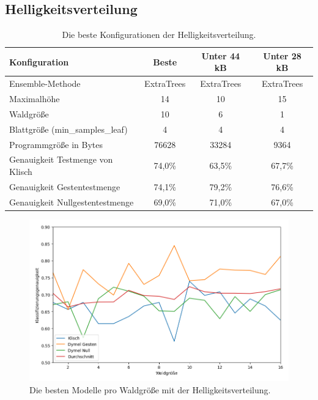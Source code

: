 \subsection{Helligkeitsverteilung}
\begin{table}[h!]
    \centering
    \begin{tabular}{ | l | c | c | c |}
        \hline
        Konfiguration & Beste & Unter 44 kB & Unter 28 kB \\\hline
        Ensemble-Methode & ExtraTrees & ExtraTrees & ExtraTrees \\\hline
        Maximalhöhe & 14 & 10 & 15 \\\hline
        Waldgröße & 10 & 6 & 1 \\\hline
        Blattgröße (min\_samples\_leaf) & 4 & 4 & 4 \\\hline
        Programmgröße in Bytes & 76628 & 33284 & 9364 \\\hline
        Genauigkeit Testmenge von Klisch & 74,0\% & 63,5\% & 67,7\% \\\hline
        Genauigkeit Gestentestmenge & 74,1\% & 79,2\% & 76,6\% \\\hline
        Genauigkeit Nullgestentestmenge & 69,0\% & 71,0\% & 67,0\% \\\hline
    \end{tabular}
    \caption{Die beste Konfigurationen der Helligkeitsverteilung.}
    \label{tab:helligkeitsverteilung}
\end{table}
\begin{figure}[h!]
    \centering
    \includegraphics[width=\linewidth]{images/helligkeitsverteilung_acc_per_size.png}
    \caption{Die besten Modelle pro Waldgröße mit der Helligkeitsverteilung.}
    \label{fig:helligkeitsverteilung_per_forest_size}
\end{figure}
